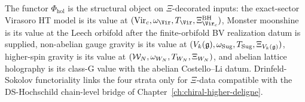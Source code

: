 The functor $\Phi_{\mathrm{hol}}$ is the structural object on
\(\Xi\)-decorated inputs: the exact-sector Virasoro HT model is its
value at
\((\mathrm{Vir}_c,\omega_{\Vir},T_{\Vir},
\Xi_{\Vir_c}^{\mathrm{BH}})\), Monster moonshine is its value at the
Leech orbifold after the finite-orbifold BV realization datum is
supplied, non-abelian gauge gravity is its value at
\((V_k(\mathfrak{g}),\omega_{\mathrm{Sug}},T_{\mathrm{Sug}},\Xi_{V_k(\mathfrak{g})})\),
higher-spin gravity is its value at \((\mathcal{W}_N,\omega_{W_N},T_{W_N},
\Xi_{W_N})\), and abelian lattice holography is its class-G value with
the abelian Costello--Li datum. Drinfeld-Sokolov functoriality links
the four strata only for \(\Xi\)-data compatible with the
DS-Hochschild chain-level bridge of
Chapter~\ref*{ch:chiral-higher-deligne}.
